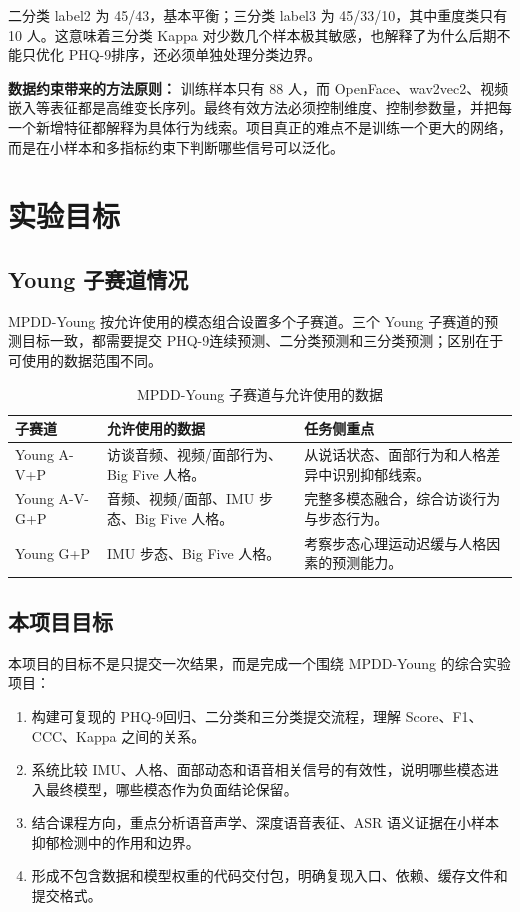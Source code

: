 \documentclass[UTF8,zihao=-4,fontset=windows]{ctexart}
\newcommand{\phq}{PHQ-9}
\newcommand{\ccc}{CCC}
\newcommand{\score}{Score}
\begin{document}
二分类 label2 为 45/43，基本平衡；三分类 label3 为 45/33/10，其中重度类只有 10 人。这意味着三分类 Kappa 对少数几个样本极其敏感，也解释了为什么后期不能只优化 \phq 排序，还必须单独处理分类边界。

\begin{takeawaybox}
\textbf{数据约束带来的方法原则：} 训练样本只有 88 人，而 OpenFace、wav2vec2、视频嵌入等表征都是高维变长序列。最终有效方法必须控制维度、控制参数量，并把每一个新增特征都解释为具体行为线索。项目真正的难点不是训练一个更大的网络，而是在小样本和多指标约束下判断哪些信号可以泛化。
\end{takeawaybox}

\section{实验目标}

\subsection{Young 子赛道情况}

MPDD-Young 按允许使用的模态组合设置多个子赛道。三个 Young 子赛道的预测目标一致，都需要提交 \phq 连续预测、二分类预测和三分类预测；区别在于可使用的数据范围不同。

\begin{table}[H]
  \centering
  \caption{MPDD-Young 子赛道与允许使用的数据}
  \begin{tabularx}{\linewidth}{lX X}
    \toprule
    子赛道 & 允许使用的数据 & 任务侧重点 \\
    \midrule
    Young A-V+P & 访谈音频、视频/面部行为、Big Five 人格。 & 从说话状态、面部行为和人格差异中识别抑郁线索。 \\
    Young A-V-G+P & 音频、视频/面部、IMU 步态、Big Five 人格。 & 完整多模态融合，综合访谈行为与步态行为。 \\
    Young G+P & IMU 步态、Big Five 人格。 & 考察步态心理运动迟缓与人格因素的预测能力。 \\
    \bottomrule
  \end{tabularx}
\end{table}

\subsection{本项目目标}

本项目的目标不是只提交一次结果，而是完成一个围绕 MPDD-Young 的综合实验项目：
\begin{enumerate}
  \item 构建可复现的 \phq 回归、二分类和三分类提交流程，理解 \score、F1、\ccc、Kappa 之间的关系。
  \item 系统比较 IMU、人格、面部动态和语音相关信号的有效性，说明哪些模态进入最终模型，哪些模态作为负面结论保留。
  \item 结合课程方向，重点分析语音声学、深度语音表征、ASR 语义证据在小样本抑郁检测中的作用和边界。
  \item 形成不包含数据和模型权重的代码交付包，明确复现入口、依赖、缓存文件和提交格式。
\end{enumerate}
\end{document}
